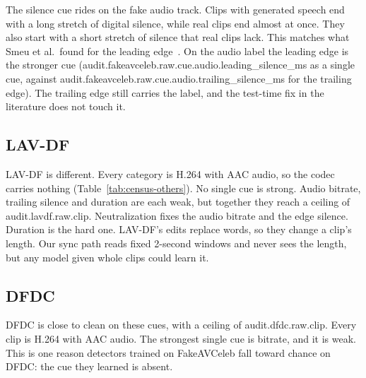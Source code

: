 The silence cue rides on the fake audio track. Clips with generated speech end
with a long stretch of digital silence, while real clips end almost at once.
They also start with a short stretch of silence that real clips lack. This
matches what Smeu et al.\ found for the leading edge~\cite{smeu2025}. On the
audio label the leading edge is the stronger cue
({{audit.fakeavceleb.raw.cue.audio.leading_silence_ms}} as a single cue,
against {{audit.fakeavceleb.raw.cue.audio.trailing_silence_ms}} for the
trailing edge). The trailing edge still carries the label, and the test-time
fix in the literature does not touch it.

\subsection{LAV-DF}

LAV-DF is different. Every category is H.264 with AAC audio, so the codec
carries nothing (Table~\ref{tab:census-others}). No single cue is strong.
Audio bitrate, trailing silence and duration are each weak, but together they
reach a ceiling of {{audit.lavdf.raw.clip}}. Neutralization fixes the audio
bitrate and the edge silence. Duration is the hard one. LAV-DF's edits replace
words, so they change a clip's length. Our sync path reads fixed 2-second
windows and never sees the length, but any model given whole clips could learn
it.

\subsection{DFDC}

DFDC is close to clean on these cues, with a ceiling of
{{audit.dfdc.raw.clip}}. Every clip is H.264 with AAC audio. The strongest
single cue is bitrate, and it is weak. This is one reason detectors trained on
FakeAVCeleb fall toward chance on DFDC: the cue they learned is absent.


